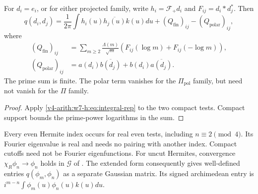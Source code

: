 \begin{theorem}
\label{v4-arith:w7-h:thm:gram-formula}
For $d_i=e_i$, or for either projected family, write
$h_i=\mathcal F_+d_i$ and $F_{ij}=d_i*d_j^*$.
Then
\begin{equation}
\label{v4-arith:w7-h:eq:gram-formula}
 q(d_i,d_j)=\frac1{2\pi}\int h_i(u)\overline{h_j(u)}k(u)du
             +(Q_{\mathrm{fin}})_{ij}-(Q_{\mathrm{polar}})_{ij},
\end{equation}
where
\begin{align}
\label{v4-arith:w7-h:eq:gram-fin}
 (Q_{\mathrm{fin}})_{ij}
 &=\sum_{m\ge2}\frac{\Lambda(m)}{\sqrt m}
        (F_{ij}(\log m)+F_{ij}(-\log m)),\\
\label{v4-arith:w7-h:eq:gram-polar}
 (Q_{\mathrm{polar}})_{ij}
 &=a(d_i)\overline{b(d_j)}+b(d_i)\overline{a(d_j)}.
\end{align}
The prime sum is finite. The polar term vanishes for the
$\Pi_{\mathrm{pol}}$ family, but need not vanish for the $\Pi$ family.
\end{theorem}
\begin{proof}
Apply \eqref{v4-arith:w7-h:eq:integral-rep} to the two compact tests.
Compact support bounds the prime-power logarithms in the sum.
\end{proof}
\begin{remark}
\label{v4-arith:w7-h:rem:reality}
Every even Hermite index occurs for real even tests, including
$n\equiv2\pmod4$. Its Fourier eigenvalue is real and needs no pairing
with another index. Compact cutoffs need not be Fourier eigenfunctions.
For uncut Hermites, convergence $\chi_R\phi_n\to\phi_n$ holds in
$\mathscr G$ of .
The extended form consequently gives well-defined entries
$q(\phi_m,\phi_n)$ as a separate Gaussian matrix.
Its signed archimedean entry is
$i^{m-n}\int\phi_m(u)\phi_n(u)k(u)du$.
\end{remark}


